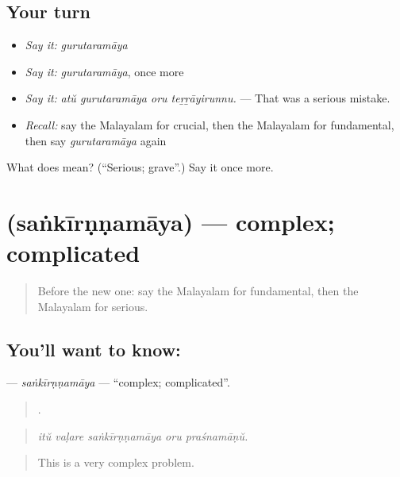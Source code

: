 \subsection*{Your turn}
\begin{itemize}
\raggedright
  \item \emph{Say it:} \emph{gurutaramāya}
  \item \emph{Say it:} \emph{gurutaramāya}, once more
  \item \emph{Say it:} \emph{atŭ gurutaramāya oru teṟṟāyirunnu.} — That was a serious mistake.
  \item \emph{Recall:} say the Malayalam for crucial, then the Malayalam for fundamental, then say \emph{gurutaramāya} again
\end{itemize}

\begin{tcolorbox}[breakable,colback=teal!4,colframe=teal!35!black,title={Before you move on}]
What does  mean? (\textquotedblleft{}Serious; grave\textquotedblright{}.) Say it once more.
\end{tcolorbox}
\section[\texorpdfstring{\ml{സങ്കീർണ്ണമായ} (saṅkīrṇṇamāya)}{സങ്കീർണ്ണമായ (saṅkīrṇṇamāya)}]{ (saṅkīrṇṇamāya) — complex; complicated}

\label{lesson:ML-C445-sankirnnamaya}



\begin{quote}
Before the new one: say the Malayalam for fundamental, then the Malayalam for serious.
\end{quote}

\subsection*{You'll want to know: }
\textbf{} — \emph{saṅkīrṇṇamāya} — \textquotedblleft{}complex; complicated\textquotedblright{}.

\begin{quote}
    .
\end{quote}

\begin{quote}
\emph{itŭ vaḷare saṅkīrṇṇamāya oru praśnamāṇŭ.}
\end{quote}

\begin{quote}
This is a very complex problem.
\end{quote}

